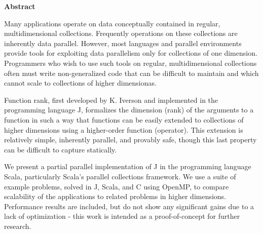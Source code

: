 \begin{center}

\bigskip

\begin{Large}
\textbf{\theTitle}
\end{Large}

\bigskip

\begin{large}
\theAuthor
\end{large}

\bigskip
\bigskip

\textbf{Abstract}

\end{center}

\noindent
Many applications operate on data conceptually contained in regular, multidimensional collections.
Frequently operations on these collections are inherently data parallel.
However, most languages and parallel environments provide tools for exploiting data parallelism only for collections of one dimension.
Programmers who wish to use such tools on regular, multidimensional collections often must write non-generalized code that can be difficult to maintain and which cannot scale to collections of higher dimensionas.

Function rank, first developed by K. Iverson and implemented in the programming language J, formalizes the dimension (rank) of the arguments to a function in such a way that functions can be easily extended to collections of higher dimensions using a higher-order function (operator).
This extension is relatively simple, inherently parallel, and provably safe, though this last property can be difficult to capture statically.

We present a partial parallel implementation of J in the programming language Scala, particularly Scala's parallel collections framework.
We use a suite of example problems, solved in J, Scala, and C using OpenMP, to compare scalability of the applications to related problems in higher dimensions.
Performance results are included, but do not show any significant gains due to a lack of optimization - this work is intended as a proof-of-concept for further research.
